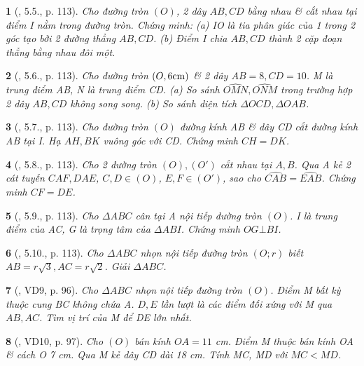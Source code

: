\documentclass{article}
\newtheorem{baitoan}{}
\begin{document}
\begin{baitoan}[\cite{Binh_boi_duong_Toan_9_tap_1}, 5.5., p. 113]
	Cho đường tròn $(O)$, 2 dây $AB,CD$ bằng nhau \& cắt nhau tại điểm I nằm trong đường tròn. Chứng minh: (a) IO là tia phân giác của 1 trong 2 góc tạo bởi 2 đường thẳng $AB,CD$. (b) Điểm I chia $AB,CD$ thành 2 cặp đoạn thẳng bằng nhau đôi một.
\end{baitoan}

\begin{baitoan}[\cite{Binh_boi_duong_Toan_9_tap_1}, 5.6., p. 113]
	Cho đường tròn $(O,6{\rm cm})$ \& 2 dây $AB = 8,CD = 10$. M là trung điểm AB, N là trung điểm CD. (a) So sánh $\widehat{OMN},\widehat{ONM}$ trong trường hợp 2 dây $AB,CD$ không song song. (b) So sánh diện tích $\Delta OCD,\Delta OAB$.
\end{baitoan}

\begin{baitoan}[\cite{Binh_boi_duong_Toan_9_tap_1}, 5.7., p. 113]
	Cho đường tròn $(O)$ đường kính AB \& dây CD cắt đường kính AB tại I. Hạ $AH,BK$ vuông góc với CD. Chứng minh $CH = DK$.
\end{baitoan}

\begin{baitoan}[\cite{Binh_boi_duong_Toan_9_tap_1}, 5.8., p. 113]
	Cho 2 đường tròn $(O),(O')$ cắt nhau tại $A,B$. Qua A kẻ 2 cát tuyến $CAF,DAE$, $C,D\in(O)$, $E,F\in(O')$, sao cho $\widehat{CAB} = \widehat{EAB}$. Chứng minh $CF = DE$.
\end{baitoan}

\begin{baitoan}[\cite{Binh_boi_duong_Toan_9_tap_1}, 5.9., p. 113]
	Cho $\Delta ABC$ cân tại A nội tiếp đường  tròn $(O)$. I là trung điểm của AC, G là trọng tâm của $\Delta ABI$. Chứng minh $OG\bot BI$.
\end{baitoan}

\begin{baitoan}[\cite{Binh_boi_duong_Toan_9_tap_1}, 5.10., p. 113]
	Cho $\Delta ABC$ nhọn nội tiếp đường tròn $(O;r)$ biết $AB = r\sqrt{3},AC = r\sqrt{2}$. Giải $\Delta ABC$.
\end{baitoan}

\begin{baitoan}[\cite{Binh_Toan_9_tap_1}, VD9, p. 96]
	Cho $\Delta ABC$ nhọn nội tiếp đường tròn $(O)$. Điểm M bất kỳ thuộc cung BC không chứa A. $D,E$ lần lượt là các điểm đối xứng với M qua $AB,AC$. Tìm vị trí của M để DE lớn nhất.
\end{baitoan}

\begin{baitoan}[\cite{Binh_Toan_9_tap_1}, VD10, p. 97]
	Cho $(O)$ bán kính $OA = 11$ {\rm cm}. Điểm M thuộc bán kính OA \& cách O {\rm7 cm}. Qua M kẻ dây CD dài {\rm18 cm}. Tính MC, MD với $MC < MD$.
\end{baitoan}
\end{document}
